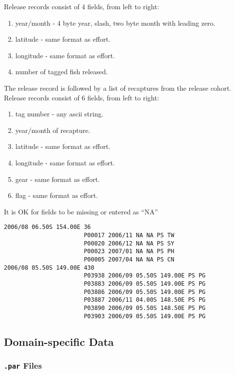 Release records consist of 4 fields, from left to right:
\begin{enumerate}
\item year/month - 4 byte year, slash, two byte month with leading
zero.
\item latitude - same format as effort.
\item longitude - same format as effort.
\item number of tagged fish released.
\end{enumerate}

The release record is followed by a list of recaptures from the
release cohort. Release records consist of 6 fields, from left to
right:
\begin{enumerate}
\item tag number - any ascii string.
\item year/month of recapture.
\item latitude - same format as effort.
\item longitude - same format as effort.
\item gear - same format as effort.
\item flag - same format as effort.
\end{enumerate}
It is OK for fields to be missing or entered as ``NA''

{\par{}\normalbaselineskip
\begin{verbatim}
2006/08 06.50S 154.00E 36
                       P00017 2006/11 NA NA PS TW
                       P00020 2006/12 NA NA PS SY
                       P00023 2007/01 NA NA PS PH
                       P00005 2007/04 NA NA PS CN
2006/08 05.50S 149.00E 430
                       P03938 2006/09 05.50S 149.00E PS PG
                       P03883 2006/09 05.50S 149.00E PS PG
                       P03886 2006/09 05.50S 149.00E PS PG
                       P03887 2006/11 04.00S 148.50E PS PG
                       P03890 2006/09 05.50S 148.50E PS PG
                       P03903 2006/09 05.50S 149.00E PS PG
\end{verbatim}
\par}

\subsection*{Domain-specific Data}
\subsubsection*{{\tt .par} Files}


